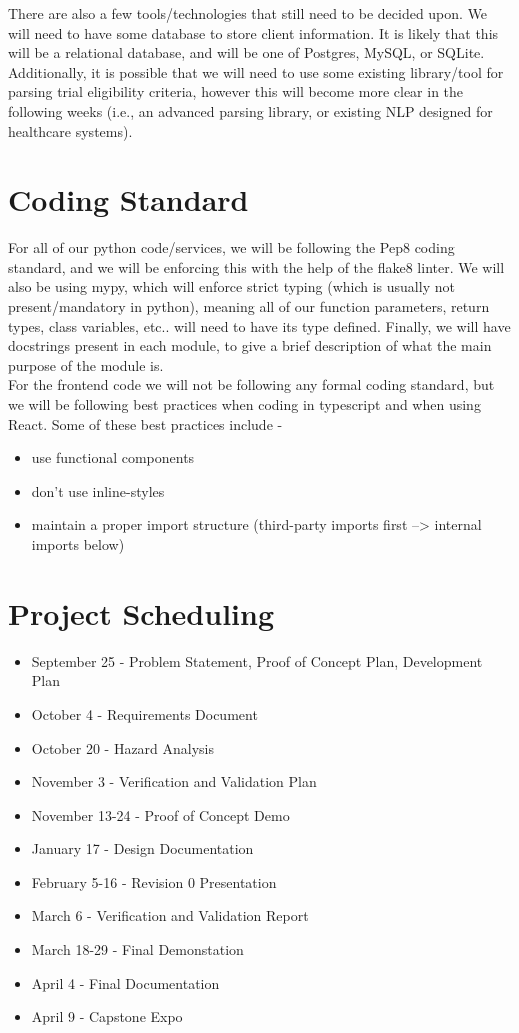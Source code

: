 \documentclass{article}
\begin{document}
There are also a few tools/technologies that still need to be decided upon. We will need to have some database to store
client information. It is likely that this will be a relational database, and will be one of Postgres, MySQL, or SQLite.
Additionally, it is possible that we will need to use some existing library/tool for parsing trial eligibility criteria, however this 
will become more clear in the following weeks (i.e., an advanced parsing library, or existing NLP designed for healthcare systems).

\section{Coding Standard}

For all of our python code/services, we will be following the Pep8 coding standard, and we will be enforcing this 
with the help of the flake8 linter. We will also be using mypy, which will enforce strict typing (which is usually not present/mandatory
in python), meaning all of our function parameters, return types, class variables, etc.. will need to have its type defined. Finally, we will
have docstrings present in each module, to give a brief description of what the main purpose of the module is.\\

For the frontend code we will not be following any formal coding standard, but we will be following best practices
when coding in typescript and when using React. Some of these best practices include - 

\begin{itemize}
	\item use functional components
	\item don't use inline-styles
	\item maintain a proper import structure (third-party imports first --> internal imports below)
\end{itemize}

\section{Project Scheduling}

\begin{itemize}
	\item September 25 - Problem Statement, Proof of Concept Plan, Development Plan
	\item October 4 - Requirements Document
	\item October 20 - Hazard Analysis
	\item November 3 - Verification and Validation Plan
	\item November 13-24 - Proof of Concept Demo
	\item January 17 - Design Documentation
	\item February 5-16 - Revision 0 Presentation
	\item March 6 - Verification and Validation Report
	\item March 18-29 - Final Demonstation
	\item April 4 - Final Documentation
	\item April 9 - Capstone Expo
\end {itemize}
\end{document}
